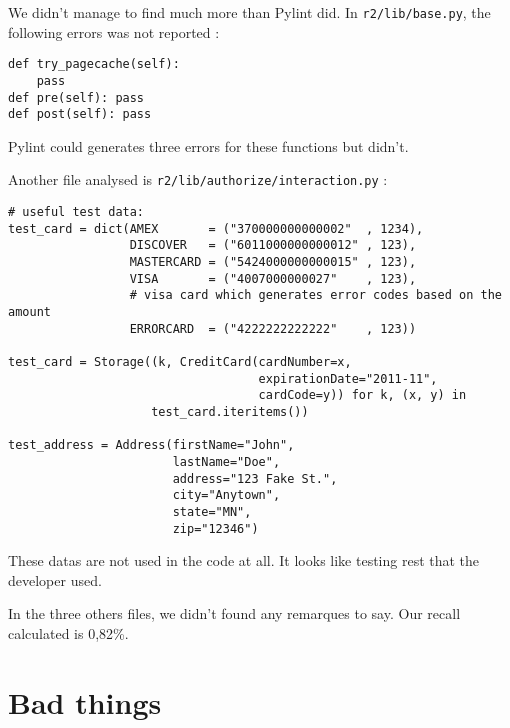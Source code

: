\documentclass[11pt, a4paper]{article}
\newcommand{\pyl}{\textsf{Pylint}}
\begin{document}
We didn't manage to find much more than Pylint did. In \texttt{r2/lib/base.py}, the following errors was not reported :

\begin{lstlisting}[caption= 3 useless functions]
def try_pagecache(self):
    pass
def pre(self): pass
def post(self): pass
\end{lstlisting}

\pyl{} could generates three errors for these functions but didn't.


Another file analysed is \texttt{r2/lib/authorize/interaction.py} :

\begin{lstlisting}[caption= test data in the file..]
# useful test data:
test_card = dict(AMEX       = ("370000000000002"  , 1234),
                 DISCOVER   = ("6011000000000012" , 123),
                 MASTERCARD = ("5424000000000015" , 123),
                 VISA       = ("4007000000027"    , 123),
                 # visa card which generates error codes based on the amount
                 ERRORCARD  = ("4222222222222"    , 123))

test_card = Storage((k, CreditCard(cardNumber=x,
                                   expirationDate="2011-11",
                                   cardCode=y)) for k, (x, y) in
                    test_card.iteritems())

test_address = Address(firstName="John",
                       lastName="Doe",
                       address="123 Fake St.",
                       city="Anytown",
                       state="MN",
                       zip="12346")
\end{lstlisting}

These datas are not used in the code at all. It looks like testing rest that the developer used.

In the three others files, we didn't found any remarques to say. Our recall calculated is 0,82\%.

\section{Bad things}
\end{document}
